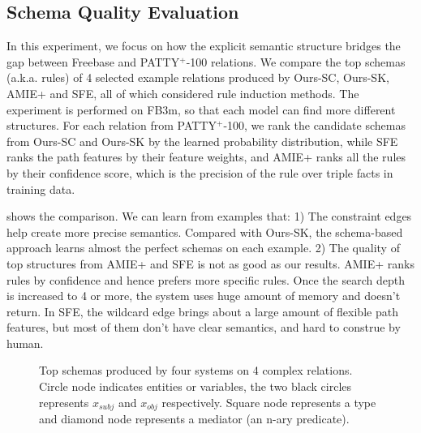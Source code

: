 
\subsection{Schema Quality Evaluation}

In this experiment, we focus on how the explicit semantic structure bridges
the gap between Freebase and PATTY$^+$-100 relations.
We compare the top schemas (a.k.a. rules)
of 4 selected example relations produced by Ours-SC, Ours-SK, AMIE+ and SFE,
all of which considered rule induction methods.
The experiment is performed on FB3m, so that each model
can find more different structures.
For each relation from PATTY$^+$-100, we rank the
candidate schemas from Ours-SC and Ours-SK by the learned probability distribution,
while SFE ranks the path features by their feature weights,
and AMIE+ ranks all the rules by their confidence score,
which is the precision of the rule over triple facts in training data.

 shows the comparison.
We can learn from examples that:
1) The constraint edges help create more precise semantics.
   Compared with Ours-SK, the schema-based approach learns almost the perfect
   schemas on each example.
2) The quality of top structures from AMIE+ and SFE is not as good as our results.
   AMIE+ ranks rules by confidence and hence prefers more specific rules.
   Once the search depth is increased to 4 or more, the system
   uses huge amount of memory and doesn't return.
   In SFE, the wildcard edge brings about a large amount of flexible path features,
   but most of them don't have clear semantics, and hard to construe by human.


\begin{figure*}[t]
\centering
\caption{Top schemas produced by four systems on 4 complex relations.
Circle node indicates entities or variables, the two black circles represents
$x_{subj}$ and $x_{obj}$ respectively. Square node represents a type
and diamond node represents a mediator (an n-ary predicate).}
\label{fig:relation-example}
\end{figure*}



